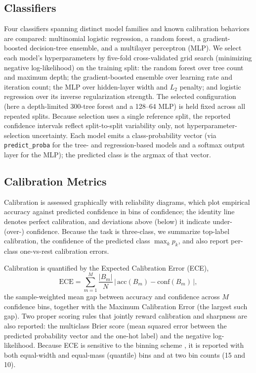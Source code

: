 \documentclass[conference]{IEEEtran}
\begin{document}
\subsection{Classifiers}
Four classifiers spanning distinct model families and known calibration behaviors are compared: multinomial logistic regression, a random forest, a gradient-boosted decision-tree ensemble, and a multilayer perceptron (MLP). We select each model's hyperparameters by five-fold cross-validated grid search (minimizing negative log-likelihood) on the training split: the random forest over tree count and maximum depth; the gradient-boosted ensemble over learning rate and iteration count; the MLP over hidden-layer width and $L_2$ penalty; and logistic regression over its inverse regularization strength. The selected configuration (here a depth-limited 300-tree forest and a 128--64 MLP) is held fixed across all repeated splits. Because selection uses a single reference split, the reported confidence intervals reflect split-to-split variability only, not hyperparameter-selection uncertainty. Each model emits a class-probability vector (via \texttt{predict\_proba} for the tree- and regression-based models and a softmax output layer for the MLP); the predicted class is the argmax of that vector.

\subsection{Calibration Metrics}
Calibration is assessed graphically with reliability diagrams, which plot empirical accuracy against predicted confidence in bins of confidence; the identity line denotes perfect calibration, and deviations above (below) it indicate under- (over-) confidence. Because the task is three-class, we summarize top-label calibration, the confidence of the predicted class $\max_k p_k$, and also report per-class one-vs-rest calibration errors.

Calibration is quantified by the Expected Calibration Error (ECE),
\begin{equation}
\mathrm{ECE} = \sum_{m=1}^{M} \frac{|B_m|}{N}\,\bigl|\,\mathrm{acc}(B_m) - \mathrm{conf}(B_m)\,\bigr|,
\end{equation}
the sample-weighted mean gap between accuracy and confidence across $M$ confidence bins, together with the Maximum Calibration Error (the largest such gap). Two proper scoring rules that jointly reward calibration and sharpness are also reported: the multiclass Brier score \cite{r4} (mean squared error between the predicted probability vector and the one-hot label) and the negative log-likelihood. Because ECE is sensitive to the binning scheme \cite{r3}, it is reported with both equal-width and equal-mass (quantile) bins and at two bin counts (15 and 10).
\end{document}
